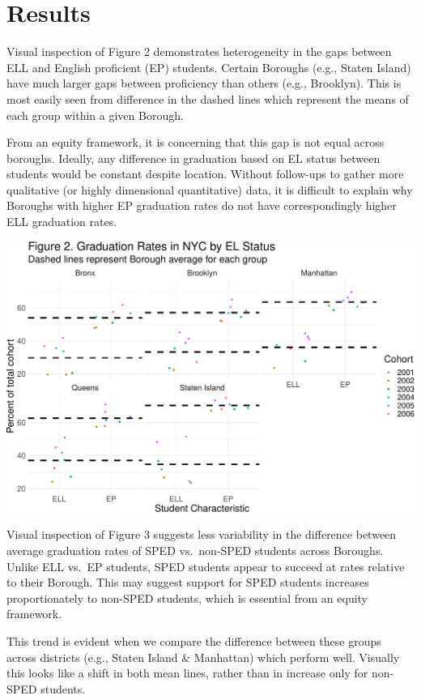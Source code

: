 \documentclass[
  english,
  man, fleqn, noextraspace]{apa6}
\begin{document}
\hypertarget{results}{%
\section{Results}\label{results}}

Visual inspection of Figure 2 demonstrates heterogeneity in the gaps between ELL and English proficient (EP) students. Certain Boroughs (e.g., Staten Island) have much larger gaps between proficiency than others (e.g., Brooklyn). This is most easily seen from difference in the dashed lines which represent the means of each group within a given Borough.

From an equity framework, it is concerning that this gap is not equal across boroughs. Ideally, any difference in graduation based on EL status between students would be constant despite location. Without follow-ups to gather more qualitative (or highly dimensional quantitative) data, it is difficult to explain why Boroughs with higher EP graduation rates do not have correspondingly higher ELL graduation rates.

\includegraphics{EDLD_651_Final_Project_Draft_files/figure-latex/graph_results_EL_graph-1.pdf}

Visual inspection of Figure 3 suggests less variability in the difference between average graduation rates of SPED vs.~non-SPED students across Boroughs. Unlike ELL vs.~EP students, SPED students appear to succeed at rates relative to their Borough. This may suggest support for SPED students increases proportionately to non-SPED students, which is essential from an equity framework.

This trend is evident when we compare the difference between these groups across districts (e.g., Staten Island \& Manhattan) which perform well. Visually this looks like a shift in both mean lines, rather than in increase only for non-SPED students.
\end{document}
